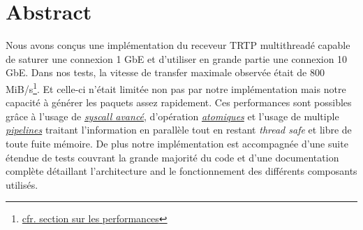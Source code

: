 \documentclass[8pt]{article}
\begin{document}

\newpage

\section{Abstract}

Nous avons conçus une implémentation du receveur TRTP multithreadé capable de saturer une connexion 1 GbE et d'utiliser en grande partie une connexion 10 GbE.
Dans nos tests, la vitesse de transfer maximale observée était de 800 MiB/s\footnote{\hyperref[sec:performance]{cfr. section sur les performances}}. Et celle-ci
n'était limitée non pas par notre implémentation mais notre capacité à générer les paquets assez rapidement. Ces performances sont possibles grâce à l'usage de 
\textit{\hyperref[sec:syscalls]{syscall avancé}}, d'opération \textit{\hyperref[sec:atomics]{atomiques}} et l'usage de multiple \textit{\hyperref[sec:pipelines]{pipelines}} traitant
l'information en parallèle tout en restant \textit{thread safe} et libre de toute fuite mémoire. De plus notre implémentation est accompagnée d'une suite
étendue de tests couvrant la grande majorité du code et d'une documentation complète détaillant l'architecture and le fonctionnement des différents composants
utilisés.

\newpage

\tableofcontents
\newpage


\newpage


\end{document}
